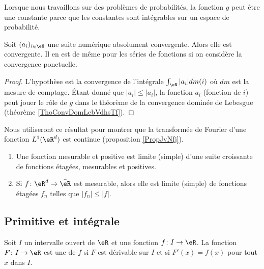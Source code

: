 \begin{remark}
    Lorsque nous travaillons sur des problèmes de probabilités, la fonction \( g\) peut être une constante parce que les constantes sont intégrables sur un espace de probabilité.
\end{remark}

\begin{corollary}       \label{CorCvAbsNormwEZdRc}
    Soit \( (a_i)_{i\in \eN}\) une suite numérique absolument convergente. Alors elle est convergente. Il en est de même pour les séries de fonctions si on considère la convergence ponctuelle.
\end{corollary}

\begin{proof}
    L'hypothèse est la convergence de l'intégrale \( \int_{\eN}| a_i |dm(i)\) où \( dm\) est la mesure de comptage. Étant donné que \( | a_i |\leq | a_i |\), la fonction \( a_i\) (fonction de \( i\)) peut jouer le rôle de \( g\) dans le théorème de la convergence dominée de Lebesgue (théorème \ref{ThoConvDomLebVdhsTf}).
\end{proof}
Nous utiliseront ce résultat pour montrer que la transformée de Fourier d'une fonction \( L^1(\eR^d)\) est continue (proposition \ref{PropJvNfj}).

\begin{proposition} \label{PropUXjnwLf}
    \begin{enumerate}
        \item
            Une fonction mesurable et positive est limite (simple) d'une suite croissante de fonctions étagées, mesurables et positives.
        \item
            Si \( f\colon \eR^d\to \bar \eR\) est mesurable, alors elle est limite (simple) de fonctions étagées \( f_n\) telles que \( | f_n |\leq | f |\).
    \end{enumerate}
\end{proposition}

\subsection{Primitive et intégrale}

\begin{definition}
    Soit \( I\) un intervalle ouvert de \( \eR\) et une fonction \( f\colon I\to \eR\). La fonction \( F\colon I\to \eR\) est une  de \( f\) si \( F\) est dérivable sur \( I\) et si \( F'(x)=f(x)\) pour tout \( x\) dans \( I\).
\end{definition}

